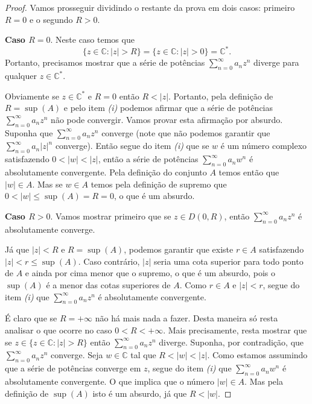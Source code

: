 \begin{proof}
Vamos prosseguir dividindo o restante da prova em dois casos: primeiro $R=0$ 
e o segundo $R>0$.

\bigskip 
\noindent
\textbf{Caso $R=0$}. Neste caso temos que
\[
\{z\in\mathbb{C}: |z|>R\}
=
\{z\in\mathbb{C}: |z|> 0\}
=
\mathbb{C}^{*}.
\] 
Portanto, precisamos mostrar que   
a série de potências $\sum_{n=0}^{\infty} a_nz^n$ diverge
para qualquer $z\in\mathbb{C}^{*}$. 

Obviamente se $z\in\mathbb{C}^{*}$ e $R=0$ então $R<|z|$. 
Portanto, pela definição de $R=\sup(A)$ e pelo item \textit{(i)}
podemos afirmar que a série de potências 
$\sum_{n=0}^{\infty} a_nz^n$ não pode convergir. 
Vamos provar esta afirmação por absurdo. Suponha 
que $\sum_{n=0}^{\infty} a_nz^n$ converge (note que não podemos
garantir que $\sum_{n=0}^{\infty} a_n|z|^n$ converge).
Então segue do item \textit{(i)} que se 
$w$ é um número complexo satisfazendo $0<|w|<|z|$, então a série de potências $\sum_{n=0}^{\infty} a_nw^n$
é absolutamente convergente. Pela definição do conjunto $A$ temos então que 
$|w|\in A$. Mas se $w\in A$ temos pela definição de supremo que  
$0<|w|\leqslant \sup(A)=R=0$, o que é um absurdo.


\medskip 

\noindent
\textbf{Caso $R>0$}. 
Vamos mostrar primeiro que se $z\in D(0,R)$, então 
$\sum_{n=0}^{\infty} a_nz^n$ é absolutamente converge.

Já que $|z|<R$ e $R=\sup(A)$, podemos garantir que existe $r\in A$ 
satisfazendo $|z|<r\leqslant \sup(A)$. Caso contrário, $|z|$ seria
uma cota superior para todo ponto de $A$ e ainda por cima menor que o 
supremo, o que é um absurdo, pois o $\sup(A)$ é a menor das cotas
superiores de $A$. 
Como $r\in A$ e $|z|<r$, segue do item \textit{(i)} que $\sum_{n=0}^{\infty} a_nz^n$ 
é absolutamente convergente. 

É claro que se $R=+\infty$ não há mais nada a fazer. Desta maneira
só resta analisar o que ocorre no caso $0<R<+\infty$. 
Mais precisamente, resta mostrar que se $z\in \{z\in\mathbb{C}: |z|> R\}$
então $\sum_{n=0}^{\infty} a_nz^n$ diverge. Suponha, por contradição,
que $\sum_{n=0}^{\infty} a_nz^n$ converge. Seja $w\in\mathbb{C}$ 
tal que $R<|w|<|z|$. Como estamos assumindo que a série 
de potências converge em $z$, segue do item \textit{(i)} 
que $\sum_{n=0}^{\infty} a_nw^n$ é absolutamente convergente. O que implica
que o número $|w|\in A$. Mas pela definição de $\sup(A)$ 
isto é um absurdo, já que $R<|w|$.
\end{proof}


